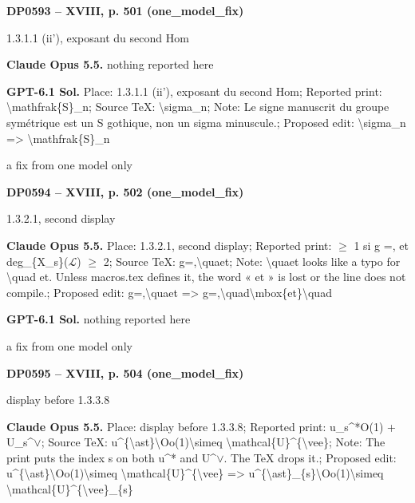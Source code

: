 \par\noindent\hypertarget{DP0593}{}\textbf{DP0593 -- XVIII, p. 501 (one\_model\_fix)}\par
1.3.1.1 (ii'), exposant du second Hom\par
\textbf{Claude Opus 5.5.} nothing reported here\par
\textbf{GPT-6.1 Sol.} Place: 1.3.1.1 (ii'), exposant du second Hom; Reported print: \textbackslash{}mathfrak\{S\}\_n; Source TeX: \textbackslash{}sigma\_n; Note: Le signe manuscrit du groupe symétrique est un S gothique, non un sigma minuscule.; Proposed edit: \textbackslash{}sigma\_n =\allowbreak > \textbackslash{}mathfrak\{S\}\_n\par
a fix from one model only\par
\par\noindent\hypertarget{DP0594}{}\textbf{DP0594 -- XVIII, p. 502 (one\_model\_fix)}\par
1.3.2.1, second display\par
\textbf{Claude Opus 5.5.} Place: 1.3.2.1, second display; Reported print: \ensuremath{\geqslant} 1 si g =, et deg\_\{X\_s\}(\ensuremath{\mathcal{L}}) \ensuremath{\geqslant} 2; Source TeX: g=,\textbackslash{}quaet; Note: \textbackslash{}quaet looks like a typo for \textbackslash{}quad et. Unless macros.tex defines it, the word « et » is lost or the line does not compile.; Proposed edit: g=,\textbackslash{}quaet =\allowbreak > g=,\textbackslash{}quad\textbackslash{}mbox\{et\}\textbackslash{}quad\par
\textbf{GPT-6.1 Sol.} nothing reported here\par
a fix from one model only\par
\par\noindent\hypertarget{DP0595}{}\textbf{DP0595 -- XVIII, p. 504 (one\_model\_fix)}\par
display before 1.3.3.8\par
\textbf{Claude Opus 5.5.} Place: display before 1.3.3.8; Reported print: u\_s\textasciicircum{}*O(1) + U\_s\textasciicircum{}\ensuremath{\vee}; Source TeX: u\textasciicircum{}\{\textbackslash{}ast\}\textbackslash{}Oo(1)\textbackslash{}simeq \textbackslash{}mathcal\{U\}\textasciicircum{}\{\textbackslash{}vee\}; Note: The print puts the index s on both u\textasciicircum{}* and U\textasciicircum{}\ensuremath{\vee}. The TeX drops it.; Proposed edit: u\textasciicircum{}\{\textbackslash{}ast\}\textbackslash{}Oo(1)\textbackslash{}simeq \textbackslash{}mathcal\{U\}\textasciicircum{}\{\textbackslash{}vee\} =\allowbreak > u\textasciicircum{}\{\textbackslash{}ast\}\_\{s\}\textbackslash{}Oo(1)\textbackslash{}simeq \textbackslash{}mathcal\{U\}\textasciicircum{}\{\textbackslash{}vee\}\_\{s\}\par
